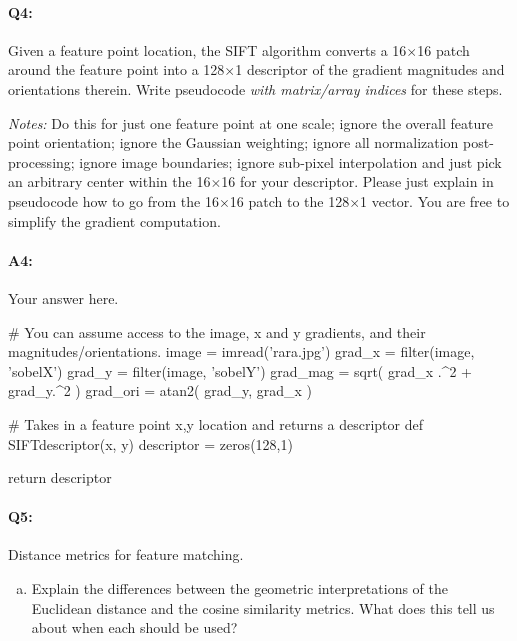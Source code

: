 \paragraph{Q4:} Given a feature point location, the SIFT algorithm converts a 16$\times$16 patch around the feature point into a 128$\times$1 descriptor of the gradient magnitudes and orientations therein. Write pseudocode \emph{with matrix/array indices} for these steps.

\emph{Notes:} Do this for just one feature point at one scale; ignore the overall feature point orientation; ignore the Gaussian weighting; ignore all normalization post-processing; ignore image boundaries; ignore sub-pixel interpolation and just pick an arbitrary center within the 16$\times$16 for your descriptor. Please just explain in pseudocode how to go from the 16$\times$16 patch to the 128$\times$1 vector. You are free to simplify the gradient computation.

\paragraph{A4:} Your answer here.

\begin{python}
# You can assume access to the image, x and y gradients, and their magnitudes/orientations.
image = imread('rara.jpg')
grad_x = filter(image, 'sobelX')
grad_y = filter(image, 'sobelY')
grad_mag = sqrt( grad_x .^2 + grad_y.^2 )
grad_ori = atan2( grad_y, grad_x )

# Takes in a feature point x,y location and returns a descriptor
def SIFTdescriptor(x, y)
    descriptor = zeros(128,1)


    return descriptor
\end{python}





\pagebreak
\paragraph{Q5:} Distance metrics for feature matching.

\begin{enumerate}[(a)]
    \item Explain the differences between the geometric interpretations of the Euclidean distance and the cosine similarity metrics. What does this tell us about when each should be used?
\end{enumerate}

